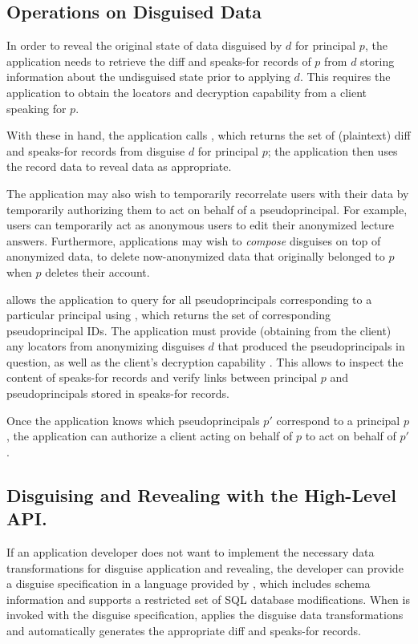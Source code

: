 \subsection{Operations on Disguised Data}
In order to reveal the original state of data disguised by $d$ for principal $p$, the application
needs to retrieve the diff and speaks-for records of $p$ from $d$ storing information about the undisguised
state prior to applying $d$.
This requires the application to obtain the locators  and decryption capability 
from a client speaking for $p$.

With these in hand, the application calls , which returns the set of
(plaintext) diff and speaks-for records from disguise $d$ for principal $p$; the application then uses
the record data to reveal data as appropriate.

The application may also wish to temporarily recorrelate users with their data by temporarily
authorizing them to act on behalf of a pseudoprincipal. For example, users can temporarily act as
anonymous users to edit their anonymized lecture answers. Furthermore, applications may wish to
\emph{compose} disguises on top of anonymized data, to \eg delete now-anonymized data that
originally belonged to $p$ when $p$ deletes their account.

\sys allows the application to query for all pseudoprincipals corresponding to a particular
principal using , which returns the set of corresponding pseudoprincipal
IDs. The application must provide (obtaining from the client) any locators  from
anonymizing disguises $d$ that produced the pseudoprincipals in question, as well as the client's
decryption capability . This allows \sys to inspect the content of speaks-for records and
verify links between principal $p$ and pseudoprincipals stored in speaks-for records.

Once the application knows which pseudoprincipals $p'$ correspond to a principal $p$, the application can
authorize a client acting on behalf of $p$ to act on behalf of $p'$.

\subsection{Disguising and Revealing with the High-Level API.}
\label{s:api-high} 
If an application developer does not want to implement the necessary data transformations for disguise
application and revealing, the developer can provide a disguise specification in a language provided
by \sys, which includes schema information and supports a restricted set of SQL database
modifications. When  is invoked with the disguise specification, \sys applies the
disguise data transformations and automatically generates the appropriate diff and speaks-for records.

